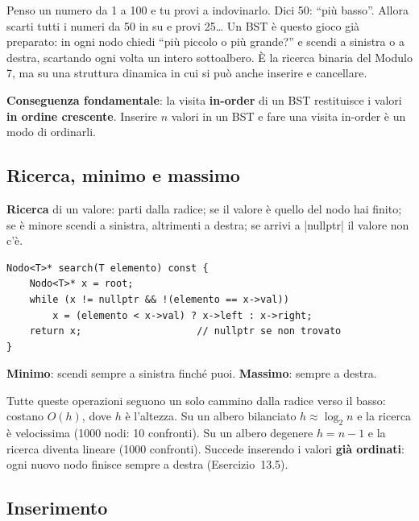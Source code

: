 \begin{analogia}
Penso un numero da 1 a 100 e tu provi a indovinarlo. Dici 50: ``più basso''. Allora
scarti tutti i numeri da 50 in su e provi 25\ldots{} Un BST è questo gioco già
preparato: in ogni nodo chiedi ``più piccolo o più grande?'' e scendi a sinistra o a
destra, scartando ogni volta un intero sottoalbero. È la ricerca binaria del Modulo 7, ma
su una struttura dinamica in cui si può anche inserire e cancellare.
\end{analogia}

\textbf{Conseguenza fondamentale}: la visita \textbf{in-order} di un BST restituisce i
valori \textbf{in ordine crescente}. Inserire $n$ valori in un BST e fare una visita
in-order è un modo di ordinarli.

\subsection*{Ricerca, minimo e massimo}

\textbf{Ricerca} di un valore: parti dalla radice; se il valore è quello del nodo hai
finito; se è minore scendi a sinistra, altrimenti a destra; se arrivi a \cc|nullptr| il
valore non c'è.
\begin{lstlisting}
Nodo<T>* search(T elemento) const {
    Nodo<T>* x = root;
    while (x != nullptr && !(elemento == x->val))
        x = (elemento < x->val) ? x->left : x->right;
    return x;                    // nullptr se non trovato
}
\end{lstlisting}
\textbf{Minimo}: scendi sempre a sinistra finché puoi. \textbf{Massimo}: sempre a destra.

Tutte queste operazioni seguono un solo cammino dalla radice verso il basso: costano
$O(h)$, dove $h$ è l'altezza. Su un albero bilanciato $h \approx \log_2 n$ e la ricerca è
velocissima (1000 nodi: 10 confronti). Su un albero degenere $h = n - 1$ e la ricerca
diventa lineare (1000 confronti). Succede inserendo i valori \textbf{già ordinati}: ogni
nuovo nodo finisce sempre a destra (Esercizio~13.5).

\subsection*{Inserimento}

